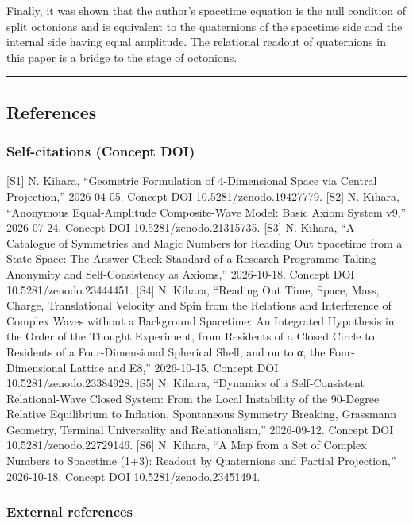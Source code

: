 \documentclass[
  a4paper,
]{article}
\begin{document}
Finally, it was shown that the author's spacetime equation is the null
condition of split octonions and is equivalent to the quaternions of the
spacetime side and the internal side having equal amplitude. The
relational readout of quaternions in this paper is a bridge to the stage
of octonions.

\begin{center}\rule{0.5\linewidth}{0.5pt}\end{center}

\subsection{References}\label{references}

\subsubsection{Self-citations (Concept
DOI)}\label{self-citations-concept-doi}

{[}S1{]} N. Kihara, ``Geometric Formulation of 4-Dimensional Space via
Central Projection,'' 2026-04-05. Concept DOI 10.5281/zenodo.19427779.
{[}S2{]} N. Kihara, ``Anonymous Equal-Amplitude Composite-Wave Model:
Basic Axiom System v9,'' 2026-07-24. Concept DOI
10.5281/zenodo.21315735. {[}S3{]} N. Kihara, ``A Catalogue of Symmetries
and Magic Numbers for Reading Out Spacetime from a State Space: The
Answer-Check Standard of a Research Programme Taking Anonymity and
Self-Consistency as Axioms,'' 2026-10-18. Concept DOI
10.5281/zenodo.23444451. {[}S4{]} N. Kihara, ``Reading Out Time, Space,
Mass, Charge, Translational Velocity and Spin from the Relations and
Interference of Complex Waves without a Background Spacetime: An
Integrated Hypothesis in the Order of the Thought Experiment, from
Residents of a Closed Circle to Residents of a Four-Dimensional
Spherical Shell, and on to α, the Four-Dimensional Lattice and E8,''
2026-10-15. Concept DOI 10.5281/zenodo.23384928. {[}S5{]} N. Kihara,
``Dynamics of a Self-Consistent Relational-Wave Closed System: From the
Local Instability of the 90-Degree Relative Equilibrium to Inflation,
Spontaneous Symmetry Breaking, Grassmann Geometry, Terminal Universality
and Relationalism,'' 2026-09-12. Concept DOI 10.5281/zenodo.22729146.
{[}S6{]} N. Kihara, ``A Map from a Set of Complex Numbers to Spacetime
(1+3): Readout by Quaternions and Partial Projection,'' 2026-10-18.
Concept DOI 10.5281/zenodo.23451494.

\subsubsection{External references}\label{external-references}
\end{document}
